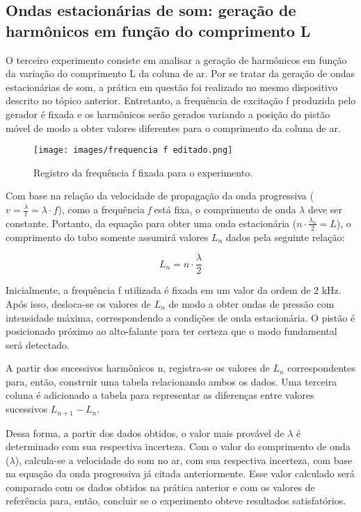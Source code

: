 \subsection{Ondas estacionárias de som: geração de harmônicos em
função do comprimento L}

O terceiro experimento consiste em analisar a geração de harmônicos em função da variação do comprimento L da coluna de ar. Por se tratar da geração de ondas estacionárias de som, a prática em questão foi realizado no mesmo dispositivo descrito no tópico anterior. Entretanto, a frequência de excitação f produzida pelo gerador é fixada e os harmônicos serão gerados variando a posição do pistão móvel de modo a obter valores diferentes para o comprimento da coluna de ar.

\begin{figure}[H]
  \centering
  \texttt{[image: images/frequencia f editado.png]}
  \caption{ Registro da frequência f fixada para o experimento.}
\end{figure}

Com base na relação da velocidade de propagação da onda progressiva ($v = \frac{\lambda}{t} = \lambda \cdot f$), como a frequência \textit{f} está fixa, o comprimento de onda $\lambda$ deve ser constante. Portanto, da equação para obter uma onda estacionária ($n \cdot \frac{\lambda_n}{2} = L$), o comprimento do tubo somente assumirá valores $L_n$ dados pela seguinte relação:

\[ L_n = n \cdot \frac{\lambda}{2}\]

Inicialmente, a frequência f utilizada é fixada em um valor da ordem de 2 kHz. Após isso, desloca-se os valores de $L_n$ de modo a obter ondas de pressão com intensidade máxima, correspondendo a condições de onda estacionária. O pistão é posicionado próximo ao alto-falante para ter certeza que o modo fundamental será detectado.

A partir dos sucessivos harmônicos n, registra-se os valores de $L_n$ correspondentes para, então, construir uma tabela relacionando ambos os dados. Uma terceira coluna é adicionado a tabela para representar as diferenças entre valores sucessivos $L_{n+1}-L_n$.

Dessa forma, a partir dos dados obtidos, o valor mais provável de $\lambda$ é determinado com sua respectiva incerteza. Com o valor do comprimento de onda ($\lambda$), calcula-se a velocidade do som no ar, com sua respectiva incerteza, com base na equação da onda progressiva já citada anteriormente. Esse valor calculado será comparado com os dados obtidos na prática anterior e com os valores de referência para, então, concluir se o experimento obteve resultados satisfatórios.
